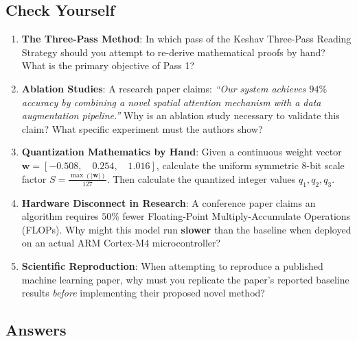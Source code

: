 \subsection{Check Yourself}

\begin{enumerate}
    \item \textbf{The Three-Pass Method}: In which pass of the Keshav Three-Pass Reading Strategy should you attempt to re-derive mathematical proofs by hand? What is the primary objective of Pass 1?

    \item \textbf{Ablation Studies}: A research paper claims: \textit{``Our system achieves $94\%$ accuracy by combining a novel spatial attention mechanism with a data augmentation pipeline.''} Why is an ablation study necessary to validate this claim? What specific experiment must the authors show?

    \item \textbf{Quantization Mathematics by Hand}: Given a continuous weight vector $\mathbf{w} = [-0.508, \quad 0.254, \quad 1.016]$, calculate the uniform symmetric 8-bit scale factor $S = \frac{\max(|\mathbf{w}|)}{127}$. Then calculate the quantized integer values $q_1, q_2, q_3$.

    \item \textbf{Hardware Disconnect in Research}: A conference paper claims an algorithm requires $50\%$ fewer Floating-Point Multiply-Accumulate Operations (FLOPs). Why might this model run \textbf{slower} than the baseline when deployed on an actual ARM Cortex-M4 microcontroller?

    \item \textbf{Scientific Reproduction}: When attempting to reproduce a published machine learning paper, why must you replicate the paper's reported baseline results \textit{before} implementing their proposed novel method?
\end{enumerate}

\subsection*{Answers}

